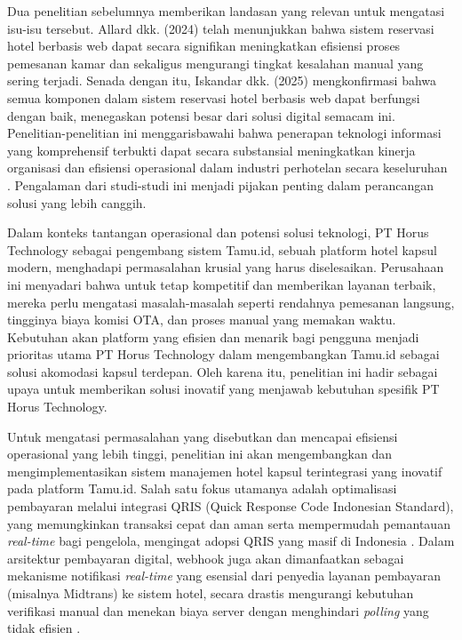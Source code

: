 Dua penelitian sebelumnya memberikan landasan yang relevan untuk mengatasi isu-isu tersebut. Allard dkk. (2024) telah menunjukkan bahwa sistem reservasi hotel berbasis web dapat secara signifikan meningkatkan efisiensi proses pemesanan kamar dan sekaligus mengurangi tingkat kesalahan manual yang sering terjadi. Senada dengan itu, Iskandar dkk. (2025) mengkonfirmasi bahwa semua komponen dalam sistem reservasi hotel berbasis web dapat berfungsi dengan baik, menegaskan potensi besar dari solusi digital semacam ini. Penelitian-penelitian ini menggarisbawahi bahwa penerapan teknologi informasi yang komprehensif terbukti dapat secara substansial meningkatkan kinerja organisasi dan efisiensi operasional dalam industri perhotelan secara keseluruhan \cite{kim2009}. Pengalaman dari studi-studi ini menjadi pijakan penting dalam perancangan solusi yang lebih canggih.

Dalam konteks tantangan operasional dan potensi solusi teknologi, PT Horus Technology sebagai pengembang sistem Tamu.id, sebuah platform hotel kapsul modern, menghadapi permasalahan krusial yang harus diselesaikan. Perusahaan ini menyadari bahwa untuk tetap kompetitif dan memberikan layanan terbaik, mereka perlu mengatasi masalah-masalah seperti rendahnya pemesanan langsung, tingginya biaya komisi OTA, dan proses manual yang memakan waktu. Kebutuhan akan platform yang efisien dan menarik bagi pengguna menjadi prioritas utama PT Horus Technology dalam mengembangkan Tamu.id sebagai solusi akomodasi kapsul terdepan. Oleh karena itu, penelitian ini hadir sebagai upaya untuk memberikan solusi inovatif yang menjawab kebutuhan spesifik PT Horus Technology.

Untuk mengatasi permasalahan yang disebutkan dan mencapai efisiensi operasional yang lebih tinggi, penelitian ini akan mengembangkan dan mengimplementasikan sistem manajemen hotel kapsul terintegrasi yang inovatif pada platform Tamu.id. Salah satu fokus utamanya adalah optimalisasi pembayaran melalui integrasi QRIS (Quick Response Code Indonesian Standard), yang memungkinkan transaksi cepat dan aman serta mempermudah pemantauan \textit{real-time} bagi pengelola, mengingat adopsi QRIS yang masif di Indonesia \cite{biqris, liqris}. Dalam arsitektur pembayaran digital, webhook juga akan dimanfaatkan sebagai mekanisme notifikasi \textit{real-time} yang esensial dari penyedia layanan pembayaran (misalnya Midtrans) ke sistem hotel, secara drastis mengurangi kebutuhan verifikasi manual dan menekan biaya server dengan menghindari \textit{polling} yang tidak efisien \cite{stripe_webhooks}.

